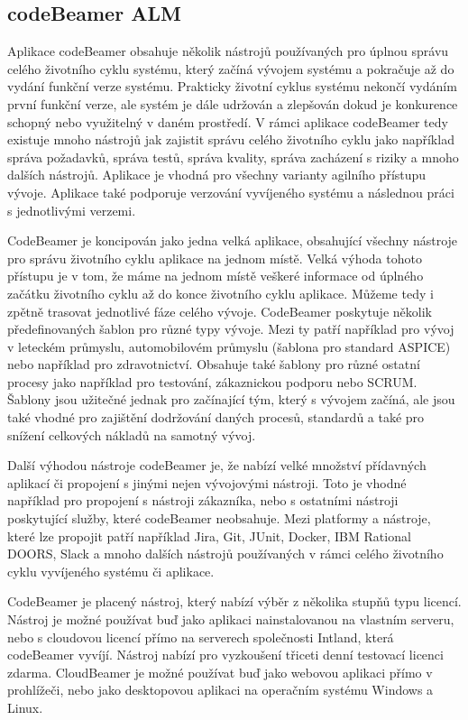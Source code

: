 \documentclass[czech,master,public,dept460,male,cpdeclaration,oneside]{diploma}
\begin{document}
\subsection{codeBeamer ALM}
\label{sec:codebeamer}
Aplikace codeBeamer obsahuje několik nástrojů používaných pro úplnou správu celého životního cyklu systému, který začíná vývojem systému a pokračuje až do vydání funkční verze systému. Prakticky životní cyklus systému nekončí vydáním první funkční verze, ale systém je dále udržován a zlepšován dokud je konkurence schopný nebo využitelný v daném prostředí. V rámci aplikace codeBeamer tedy existuje mnoho nástrojů jak zajistit správu celého životního cyklu jako například správa požadavků, správa testů, správa kvality, správa zacházení s riziky a mnoho dalších nástrojů. Aplikace je vhodná pro všechny varianty agilního přístupu vývoje. Aplikace také podporuje verzování vyvíjeného systému a následnou práci s jednotlivými verzemi. \cite{ref:about_codebeamer}

CodeBeamer je koncipován jako jedna velká aplikace, obsahující všechny nástroje pro správu životního cyklu aplikace na jednom místě. Velká výhoda tohoto přístupu je v tom, že máme na jednom místě veškeré informace od úplného začátku životního cyklu až do konce životního cyklu aplikace. Můžeme tedy i zpětně trasovat jednotlivé fáze celého vývoje. CodeBeamer poskytuje několik předefinovaných šablon pro různé typy vývoje. Mezi ty patří například pro vývoj v leteckém průmyslu, automobilovém průmyslu (šablona pro standard ASPICE) nebo například pro zdravotnictví. Obsahuje také šablony pro různé ostatní procesy jako například pro testování, zákaznickou podporu nebo SCRUM.  \cite{ref:codebeamer_templates} Šablony jsou užitečné jednak pro začínající tým, který s vývojem začíná, ale jsou také vhodné pro zajištění dodržování daných procesů, standardů a také pro snížení celkových nákladů na samotný vývoj.

Další výhodou nástroje codeBeamer je, že nabízí velké množství přídavných aplikací či propojení s jinými nejen vývojovými nástroji. Toto je vhodné například pro propojení s nástroji zákazníka, nebo s ostatními nástroji poskytující služby, které codeBeamer neobsahuje. Mezi platformy a nástroje, které lze propojit patří například Jira, Git, JUnit, Docker, IBM Rational DOORS, Slack a mnoho dalších nástrojů používaných v rámci celého životního cyklu vyvíjeného systému či aplikace.

CodeBeamer je placený nástroj, který nabízí výběr z několika stupňů typu licencí.  Nástroj je možné používat buď jako aplikaci nainstalovanou na vlastním serveru, nebo s cloudovou licencí přímo na serverech společnosti Intland, která codeBeamer vyvíjí. Nástroj nabízí pro vyzkoušení třiceti denní testovací licenci zdarma. CloudBeamer je možné používat buď jako webovou aplikaci přímo v prohlížeči, nebo jako desktopovou aplikaci na operačním systému Windows a Linux. \cite{ref:codebeamer_pricing}
\end{document}
